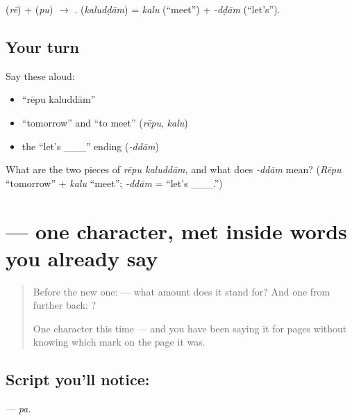 \begin{sounds}
 (\emph{rē}) +  (\emph{pu}) $\to$ .  (\emph{kaludḍām}) = \emph{kalu} (“meet”) + \emph{-dḍām} (“let's”).
\end{sounds}

\subsection*{Your turn}
Say these aloud:

\begin{itemize}
\raggedright
  \item \textquotedblleft{}rēpu kaluddām\textquotedblright{}
  \item \textquotedblleft{}tomorrow\textquotedblright{} and \textquotedblleft{}to meet\textquotedblright{} (\emph{rēpu}, \emph{kalu})
  \item the \textquotedblleft{}let's \_\_\_\textquotedblright{} ending (\emph{-ddām})
\end{itemize}

\begin{tcolorbox}[breakable,colback=teal!4,colframe=teal!35!black,title={Before you move on}]
What are the two pieces of \emph{rēpu kaluddām}, and what does \emph{-ddām} mean? (\emph{Rēpu} \textquotedblleft{}tomorrow\textquotedblright{} + \emph{kalu} \textquotedblleft{}meet\textquotedblright{}; \emph{-ddām} = \textquotedblleft{}let's \_\_\_.\textquotedblright{})
\end{tcolorbox}
\section[\texorpdfstring{\te{ప} (pa)}{ప (pa)}]{ — one character, met inside words you already say}

\label{lesson:TE-S113-letter-pa}



\begin{quote}
Before the new one:  — what amount does it stand for? And one from further back: ?

One character this time — and you have been saying it for pages without knowing which mark on the page it was.
\end{quote}

\subsection*{Script you'll notice: }
\textbf{} — \emph{pa}.

